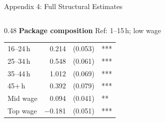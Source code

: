 \documentclass[aspectratio=169,11pt]{beamer}
\begin{document}
\begin{frame}{Appendix 4: Full Structural Estimates}
\begin{columns}[T]
\begin{column}{0.48\textwidth}
\smallskip
\textbf{Package composition}\; {\tiny Ref: 1--15\,h; low wage}\\[2pt]
\begin{tabular}{@{}l r r l@{}}
\toprule
16--24\,h &  0.214 & (0.053) & *** \\
25--34\,h &  0.548 & (0.061) & *** \\
35--44\,h &  1.012 & (0.069) & *** \\
45$+$\,h  &  0.392 & (0.079) & *** \\
Mid wage  &  0.094 & (0.041) & ** \\
Top wage  & $-$0.181 & (0.051) & *** \\
\bottomrule
\end{tabular}
\end{column}
\end{columns}
\end{frame}
\end{document}
